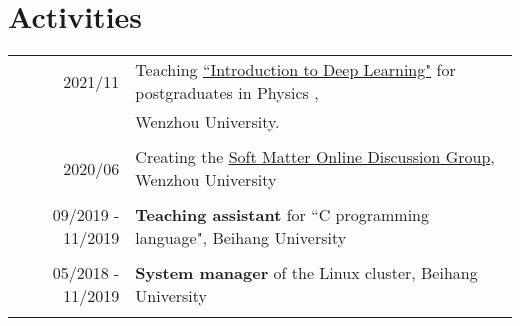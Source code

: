 \documentclass[a4paper,10pt]{article} %
\begin{document}
\section{Activities}
\begin{tabular}{r|l}	
	2021/11                        & Teaching \href{https://github.com/way2ml/forum/discussions/13}{``Introduction to Deep Learning"} for postgraduates in Physics ,\\ & Wenzhou University.\\
	\multicolumn{2}{c}{} \\	%
	 
	
	2020/06                        & Creating the \href{https://github.com/HuangJiaLian/SoftMatterDiscuss}{Soft Matter Online Discussion Group}, Wenzhou University\\
	\multicolumn{2}{c}{} \\	%
	
	09/2019 - 11/2019                     & \textbf{Teaching assistant }for  ``C programming language", Beihang University \\   	
	\multicolumn{2}{c}{} \\	%
	
	05/2018 - 11/2019                     & \textbf{System manager} of the Linux cluster,  Beihang University\\
	\multicolumn{2}{c}{} \\	%
	
\end{tabular}
\end{document}
